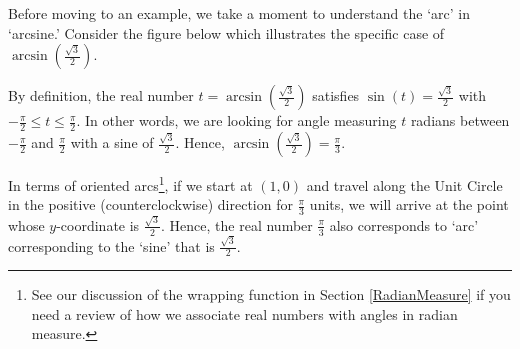 \documentclass{ximera}
\begin{document}
 


 

Before moving to an example, we take a moment to understand the `arc' in `arcsine.'  Consider the figure below which illustrates the specific case of $\arcsin\left(\frac{\sqrt{3}}{2} \right)$. 

 

By definition, the real number $t = \arcsin\left(\frac{\sqrt{3}}{2} \right)$ satisfies $\sin(t) =  \frac{\sqrt{3}}{2}$ with $-\frac{\pi}{2} \leq t \leq \frac{\pi}{2}$.  In other words, we are looking for angle measuring $t$ radians between $-\frac{\pi}{2}$ and $\frac{\pi}{2}$ with a sine of $\frac{\sqrt{3}}{2}$. Hence, $\arcsin\left(\frac{\sqrt{3}}{2} \right) = \frac{\pi}{3}$. 

 

In terms of oriented arcs\footnote{See our discussion of the wrapping function in Section \ref{RadianMeasure} if you need a review of how we associate real numbers with angles in radian measure.}, if we start at $(1,0)$  and travel along the Unit Circle in the positive (counterclockwise) direction for $\frac{\pi}{3}$ units, we will arrive at the point whose $y$-coordinate is  $\frac{\sqrt{3}}{2}$.   Hence,  the real number $\frac{\pi}{3}$ also corresponds to  `arc' corresponding to the `sine' that is $\frac{\sqrt{3}}{2}$.
\end{document}
